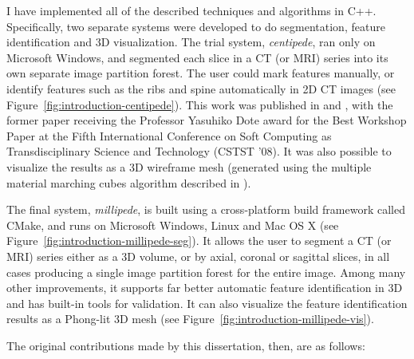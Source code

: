 I have implemented all of the described techniques and algorithms in C++. Specifically, two separate systems were developed to do segmentation, feature identification and 3D visualization. The trial system, \emph{centipede}, ran only on Microsoft Windows, and segmented each slice in a CT (or MRI) series into its own separate image partition forest. The user could mark features manually, or identify features such as the ribs and spine automatically in 2D CT images (see Figure~\ref{fig:introduction-centipede}). This work was published in \cite{gvccimi08} and \cite{gvcispa09}, with the former paper receiving the Professor Yasuhiko Dote award for the Best Workshop Paper at the Fifth International Conference on Soft Computing as Transdisciplinary Science and Technology (CSTST '08). It was also possible to visualize the results as a 3D wireframe mesh (generated using the multiple material marching cubes algorithm described in \cite{wu03}).

The final system, \emph{millipede}, is built using a cross-platform build framework called CMake, and runs on Microsoft Windows, Linux and Mac OS X (see Figure~\ref{fig:introduction-millipede-seg}). It allows the user to segment a CT (or MRI) series either as a 3D volume, or by axial, coronal or sagittal slices, in all cases producing a single image partition forest for the entire image. Among many other improvements, it supports far better automatic feature identification in 3D and has built-in tools for validation. It can also visualize the feature identification results as a Phong-lit 3D mesh (see Figure~\ref{fig:introduction-millipede-vis}).


The original contributions made by this dissertation, then, are as follows:

